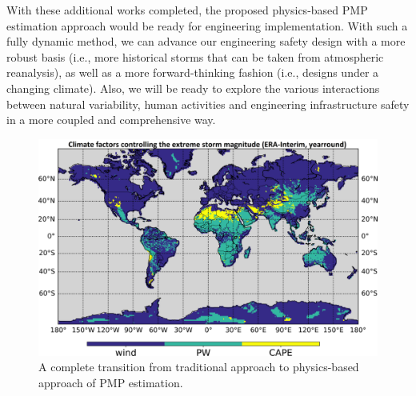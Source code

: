 With these additional works completed, the proposed physics-based PMP estimation approach would be ready for engineering implementation. With such a fully dynamic method, we can advance our engineering safety design with a more robust basis (i.e., more historical storms that can be taken from atmospheric reanalysis), as well as a more forward-thinking fashion (i.e., designs under a changing climate). Also, we will be ready to explore the various interactions between natural variability, human activities and engineering infrastructure safety in a more coupled and comprehensive way.

\begin{figure}[htbp]
	\centering
	\includegraphics[width=\linewidth]{pics/ch6/fig2.png}
	\caption{A complete transition from traditional approach to physics-based approach of PMP estimation.}
	\label{fig:6-2}
\end{figure}